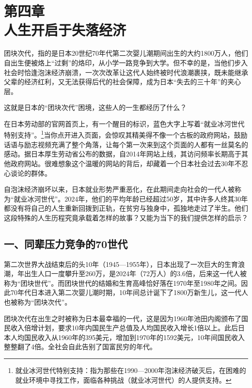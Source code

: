 

\section[第四章\q 人生开启于失落经济]{第四章\\ 人生开启于失落经济}


{\fangsong 团块次代，指的是日本20世纪70年代第二次婴儿潮期间出生的大约1800万人，他们自出生便被烙上“过剩”的烙印，从小学一路竞争到大学。但不幸的是，当他们步入社会时恰逢泡沫经济崩溃，一次次改革让这代人始终被时代浪潮裹挟，既未能继承父辈的经济红利，又无法获得后代的社会保障，成为日本“失去的三十年”的夹心层。\par}

{\fangsong 这就是日本的“团块次代”困境，这些人的一生都经历了什么？\par}

在日本劳动部的官网首页上，有一个醒目的标识，蓝色大字上写着“就业冰河世代特别支持”。\footnote{就业冰河世代特别支持：指为那些在1990—2000年泡沫经济破灭后，在困难的就业环境中寻找工作，面临各种挑战（就业冰河世代）的人提供支持。}当你点开进入页面，会惊叹其精美得不像一个古板的政府网站，鼓励话语与励志视频充满了整个角落，让每个第一次来到这个页面的人都有一丝莫名的感动。据日本厚生劳动省公布的数据，自2014年网站上线，其访问频率长期高于其他政府网站。很难想象这个温暖的网站的背后，却藏着一个日本社会过去30年不忍心谈论的群体。

自泡沫经济崩坏以来，日本就业形势严重恶化，在此期间走向社会的一代人被称为“就业冰河世代”。2024年，他们的平均年龄已经超过50岁，其中许多人终其30年都没有将自己的人生重新回拨到正轨，在贫穷与独身中，孤独地走过了半生。他们这段特殊的人生历程究竟承载着怎样的故事？又能为当下的我们提供怎样的启示？

\subsection{一、同辈压力竞争的70世代}

第二次世界大战结束后的头10年（1945—1955年），日本出现了一次巨大的生育浪潮，年出生人口一度攀升至260万，是2024年（72万人）的3.6倍，后来这一代人被称为“团块世代”。而团块世代的结婚和生育高峰恰好落在1970年至1980年之间。因此70年代日本进入第二次婴儿潮时期，10年间总计诞下了1800万新生儿，这一代人也被称为“团块次代”。

团块次代在出生之时被称为日本最幸福的一代，这是因为1960年池田内阁颁布了国民收入倍增计划，要求10年内国民生产总值及人均国民收入增长1倍以上。此后日本人均国民收入从1960年的395美元，增加到1970年的1592美元，10年间国民收入整整翻了4倍。全社会自此告别了国富民穷的年代。

